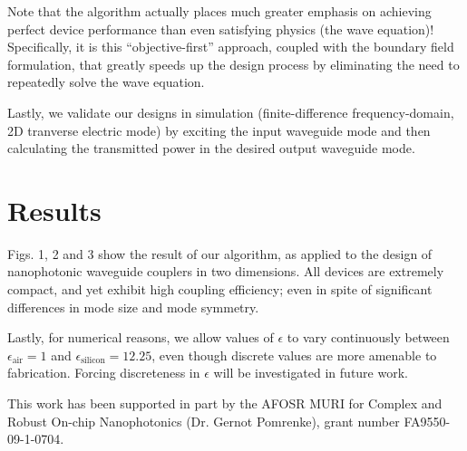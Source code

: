 \documentclass[letterpaper,10pt]{article}
\begin{document}
Note that the algorithm actually places much greater emphasis on achieving 
perfect device performance than even satisfying physics (the wave equation)!
Specifically, it is this ``objective-first'' approach, 
coupled with the boundary field formulation, 
that greatly speeds up the design process by eliminating the need to  
repeatedly solve the wave equation.

Lastly, we validate our designs in simulation 
(finite-difference frequency-domain, 2D tranverse electric mode) 
by exciting the input waveguide mode and then calculating the transmitted power
in the desired output waveguide mode.

\section{Results}
Figs. 1, 2 and 3 show the result of our algorithm, as applied to the design 
of nanophotonic waveguide couplers in two dimensions.  
All devices are extremely compact, and yet exhibit high coupling efficiency; 
even in spite of significant differences in mode size and mode symmetry.

Lastly, for numerical reasons, we allow values of $\epsilon$ to vary 
continuously between $\epsilon_\text{air} = 1$ and 
$\epsilon_\text{silicon} = 12.25$, even though discrete values are more
amenable to fabrication. 
Forcing discreteness in $\epsilon$ will be investigated in future work.


This work has been supported in part by the 
AFOSR MURI for Complex and Robust On-chip Nanophotonics (Dr. Gernot Pomrenke),
grant number FA9550-09-1-0704.
\end{document}
